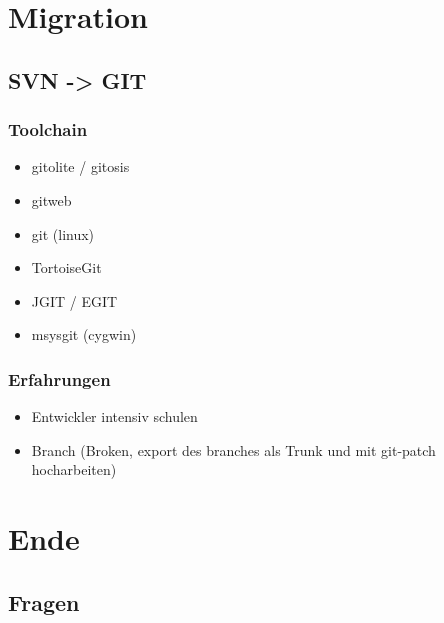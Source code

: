 \documentclass{beamer}
\begin{document}
	\section{Migration}

		\subsection{SVN -> GIT}

			\begin{frame}
				\frametitle{Toolchain}

				\begin{itemize}
					\item{gitolite / gitosis}
					\item{gitweb}
					\item{git (linux)}
					\item{TortoiseGit}
					\item{JGIT / EGIT}
					\item{msysgit (cygwin)}
				\end{itemize}
			\end{frame}

			\begin{frame}
				\frametitle{Erfahrungen}

				\begin{itemize}
					\item{Entwickler intensiv schulen}
					\item{Branch (Broken, export des branches als Trunk und mit git-patch hocharbeiten)}
				\end{itemize}
			\end{frame}

	\section{Ende}
		\subsection{Fragen}
\end{document}
